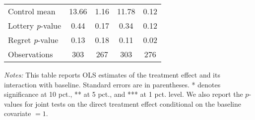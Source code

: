 \begin{table}[htbp]
{\begin{threeparttable}
\begin{tabular}{l*{4}{c}}
Control mean    &    13.66         &     1.16         &    11.78         &     0.12         \\
Lottery \emph{p}-value&     0.44         &     0.17         &     0.34         &     0.12         \\
Regret \emph{p}-value&     0.13         &     0.18         &     0.11         &     0.02         \\
Observations    &      303         &      267         &      303         &      276         \\
\bottomrule \end{tabular} \begin{tablenotes}[flushleft] \footnotesize \item \emph{Notes:} This table reports OLS estimates of the treatment effect and its interaction with baseline. Standard errors are in parentheses. * denotes significance at 10 pct., ** at 5 pct., and *** at 1 pct. level. We also report the \(p\)-values for joint tests on the direct treatment effect conditional on the baseline covariate $= 1$. \end{tablenotes} \end{threeparttable} } \end{table}
